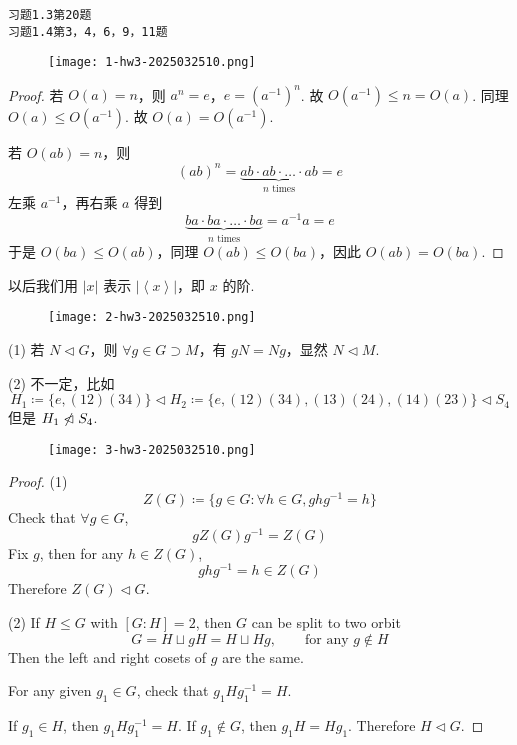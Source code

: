 \begin{lstlisting}
习题1.3第20题
习题1.4第3，4，6，9，11题
\end{lstlisting}
\begin{exercise}
\begin{figure}[H]
\centering
\texttt{[image: 1-hw3-2025032510.png]}
\label{}
\end{figure}
\end{exercise}
\begin{proof}
若 $O(a)=n$，则 $a^{n}=e$，$e=(a^{-1})^{n}$. 故 $O(a^{-1})\leq n=O(a)$. 同理 $O(a)\leq O(a^{-1})$. 故 $O(a)=O(a^{-1})$.

若 $O(ab)=n$，则
\[
(ab)^{n}=\underbrace{ ab\cdot ab\cdot\dots \cdot ab }_{ n\text{ times} }=e
\]
左乘 $a^{-1}$，再右乘 $a$ 得到
\[
\underbrace{ ba\cdot ba\cdot\dots \cdot ba }_{ n\text{ times} }=a^{-1}a=e
\]
于是 $O(ba)\leq O(ab)$，同理 $O(ab)\leq O(ba)$，因此 $O(ab)=O(ba)$.

\end{proof}

\begin{note}
以后我们用 $\lvert x \rvert$ 表示 $\lvert \left< x \right> \rvert$，即 $x$ 的阶.
\end{note}
\begin{exercise}
\begin{figure}[H]
\centering
\texttt{[image: 2-hw3-2025032510.png]}
\label{}
\end{figure}
\end{exercise}
(1) 若 $N\lhd G$，则 $\forall g\in G\supset M$，有 $gN=Ng$，显然 $N\lhd M$.

(2) 不一定，比如
\[
H_1\coloneqq\{ e, (12)(34) \}\lhd H_2\coloneqq \{ e,(12)(34),(13)(24),(14)(23) \}\lhd S_4
\]
但是 $H_1\centernot{\lhd}S_4$.

\begin{exercise}
\begin{figure}[H]
\centering
\texttt{[image: 3-hw3-2025032510.png]}
\label{}
\end{figure}
\end{exercise}
\begin{proof}
(1)
\[
Z(G)\coloneqq \{ g\in G:\forall h\in G,ghg^{-1}=h \}
\]
Check that $\forall g\in G$,
\[
gZ(G)g^{-1}=Z(G)
\]
Fix $g$, then for any $h\in Z(G)$,
\[
ghg^{-1}=h\in Z(G)
\]
Therefore $Z(G)\lhd G$.

(2)
If $H\leq G$ with $[G:H]=2$, then $G$ can be split to two orbit
\[
G=H\sqcup gH=H\sqcup Hg,\qquad \text{for any }g\not\in H
\]
Then the left and right cosets of $g$ are the same.

For any given $g_1\in G$, check that $g_1Hg_1^{-1}=H$.

If $g_1\in H$, then $g_1Hg_1 ^{-1}=H$. If $g_1\not\in G$, then $g_1H=Hg_1$. Therefore $H\lhd G$.

\end{proof}

